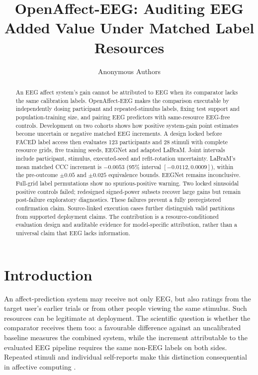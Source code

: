 \documentclass{article}
\title{OpenAffect-EEG: Auditing EEG Added Value Under Matched Label Resources}
\author{Anonymous Authors}
\begin{document}
\maketitle

\begin{abstract}
An EEG affect system's gain cannot be attributed to EEG when its comparator
lacks the same calibration labels. OpenAffect-EEG makes the comparison
executable by independently dosing participant and repeated-stimulus labels,
fixing test support and population-training size, and pairing EEG predictors
with same-resource EEG-free controls. Development on two cohorts shows how
positive system-gain point estimates become uncertain or negative matched EEG
increments. A design locked before FACED label access then evaluates 123
participants and 28 stimuli with complete resource grids, five training seeds,
EEGNet and adapted LaBraM. Joint intervals include participant, stimulus,
executed-seed and refit-rotation uncertainty. LaBraM's mean matched CCC
increment is $-0.0053$ (95\% interval $[-0.0112,0.0009]$), within the
pre-outcome $\pm0.05$ and $\pm0.025$ equivalence bounds. EEGNet remains
inconclusive. Full-grid label permutations show no spurious-positive warning.
Two locked sinusoidal positive controls failed; redesigned signed-power
subsets recover large gains but remain post-failure exploratory diagnostics.
These failures prevent a fully preregistered confirmation claim. Source-linked
execution cases further distinguish valid partitions from supported deployment
claims. The contribution is a resource-conditioned evaluation design and
auditable evidence for model-specific attribution, rather than a universal
claim that EEG lacks information.
\end{abstract}

\section{Introduction}
An affect-prediction system may receive not only EEG, but also ratings from
the target user's earlier trials or from other people viewing the same
stimulus. Such resources can be legitimate at deployment. The scientific
question is whether the comparator receives them too: a favourable difference
against an uncalibrated baseline measures the combined system, while the
increment attributable to the evaluated EEG pipeline requires the same
non-EEG labels on both sides. Repeated stimuli and individual self-reports make
this distinction consequential in affective computing
\citep{koelstra2012deap,daly2020musiceeg,chen2023faced}.
\end{document}
